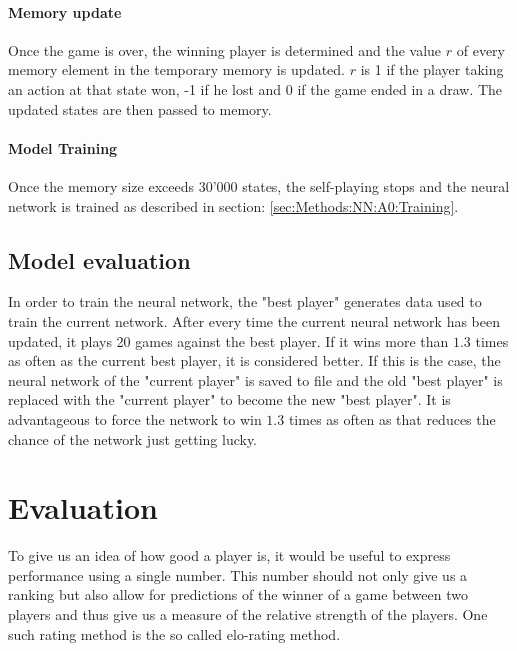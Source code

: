 \documentclass[12pt]{article}
\begin{document}
\paragraph{Memory update}
Once the game is over, the winning player is determined and the value \(r\) of every memory element in the temporary memory is updated. \(r\) is 1 if the player taking an action at that state won, -1 if he lost and 0 if the game ended in a draw. The updated states are then passed to memory.

\paragraph{Model Training}
Once the memory size exceeds 30'000 states, the self-playing stops and the neural network is trained as described in section:  \ref{sec:Methods:NN:A0:Training}.

\subsection{Model evaluation}\label{sec:modelEvaluation}
In order to train the neural network, the "best player" generates data used to train the current network.
After every time the current neural network has been updated, it plays 20 games against the best player. If it wins more than \(1.3\) times as often as the current best player, it is considered better. If this is the case, the neural network of the "current player" is saved to file and the old "best player" is replaced with the "current player" to become the new "best player". It is advantageous to force the network to win \(1.3\) times as often as that reduces the chance of the network just getting lucky. 
\section{Evaluation}
To give us an idea of how good a player is, it would be useful to express performance using a single number. This number should not only give us a ranking but also allow for predictions of the winner of a game between two players and thus give us a measure of the relative strength of the players. One such rating method is the so called elo-rating method. \cite{elo1978rating}
\end{document}
